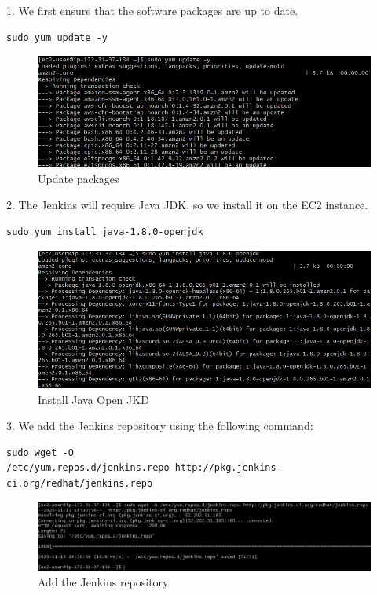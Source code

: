 \documentclass[12pt,a4paper,twoside]{article}
\begin{document}
1. We first ensure that the software packages are up to date.


\begin{verbatim}
sudo yum update -y
\end{verbatim}


\begin{figure}[H]
    \centering
        \includegraphics[width=15cm]{images-aws/14-yum-update.png}
        \caption{Update packages}
\end{figure}


2. The Jenkins will require Java JDK, so we install it on the EC2 instance.


\begin{verbatim}
sudo yum install java-1.8.0-openjdk
\end{verbatim}


\begin{figure}[H]
    \centering
        \includegraphics[width=15cm]{images-aws/15-install-java.png}
        \caption{Install Java Open JKD}
\end{figure}


3. We add the Jenkins repository using the following command:


\begin{verbatim}
sudo wget -O
/etc/yum.repos.d/jenkins.repo http://pkg.jenkins-
ci.org/redhat/jenkins.repo
\end{verbatim}


\begin{figure}[H]
    \centering
        \includegraphics[width=15cm]{images-aws/16-download-jenkins.png}
        \caption{Add the Jenkins repository}
\end{figure}
\end{document}

